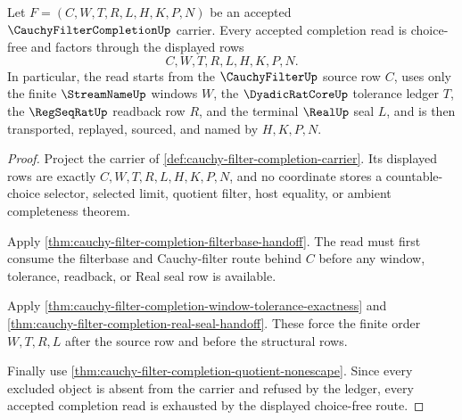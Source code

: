 \begin{theorem}
\label{thm:cauchy-filter-completion-choicefree-completion-row}
Let $F=(C,W,T,R,L,H,K,P,N)$ be an accepted $\CauchyFilterCompletionUp$ carrier. Every accepted completion read is choice-free and factors through the displayed rows
$$
C,W,T,R,L,H,K,P,N .
$$
In particular, the read starts from the $\CauchyFilterUp$ source row $C$, uses only the finite $\StreamNameUp$ windows $W$, the $\DyadicRatCoreUp$ tolerance ledger $T$, the $\RegSeqRatUp$ readback row $R$, and the terminal $\RealUp$ seal $L$, and is then transported, replayed, sourced, and named by $H,K,P,N$.
\end{theorem}
\begin{proof}
Project the carrier of \autoref{def:cauchy-filter-completion-carrier}. Its displayed rows are exactly $C,W,T,R,L,H,K,P,N$, and no coordinate stores a countable-choice selector, selected limit, quotient filter, host equality, or ambient completeness theorem.

Apply \autoref{thm:cauchy-filter-completion-filterbase-handoff}. The read must first consume the filterbase and Cauchy-filter route behind $C$ before any window, tolerance, readback, or Real seal row is available.

Apply \autoref{thm:cauchy-filter-completion-window-tolerance-exactness} and \autoref{thm:cauchy-filter-completion-real-seal-handoff}. These force the finite order $W,T,R,L$ after the source row and before the structural rows.

Finally use \autoref{thm:cauchy-filter-completion-quotient-nonescape}. Since every excluded object is absent from the carrier and refused by the ledger, every accepted completion read is exhausted by the displayed choice-free route.
\end{proof}

